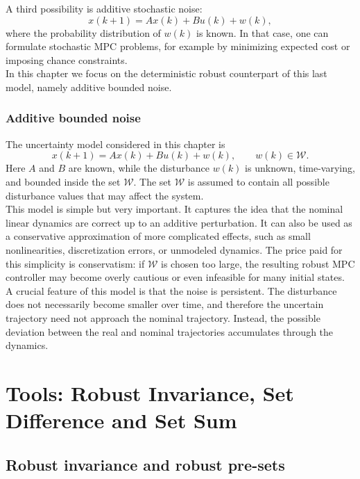 A third possibility is additive stochastic noise:
\[
    x(k+1) = Ax(k) + Bu(k) + w(k),
\]
where the probability distribution of \(w(k)\) is known. In that case, one can formulate stochastic
MPC problems, for example by minimizing expected cost or imposing chance constraints.\\
In this chapter we focus on the deterministic robust counterpart of this last model, namely
additive bounded noise.

\subsubsection{Additive bounded noise}

The uncertainty model considered in this chapter is
\[
    x(k+1) = Ax(k) + Bu(k) + w(k),
    \qquad
    w(k) \in \mathcal{W}.
\]
Here \(A\) and \(B\) are known, while the disturbance \(w(k)\) is unknown, time-varying, and
bounded inside the set \(\mathcal{W}\). The set \(\mathcal{W}\) is assumed to contain all possible
disturbance values that may affect the system.\\
This model is simple but very important. It captures the idea that the nominal linear dynamics
are correct up to an additive perturbation. It can also be used as a conservative approximation
of more complicated effects, such as small nonlinearities, discretization errors, or unmodeled
dynamics. The price paid for this simplicity is conservatism: if \(\mathcal{W}\) is chosen too large,
the resulting robust MPC controller may become overly cautious or even infeasible for many
initial states.\\

A crucial feature of this model is that the noise is persistent. The disturbance does not
necessarily become smaller over time, and therefore the uncertain trajectory need not approach
the nominal trajectory. Instead, the possible deviation between the real and nominal trajectories
accumulates through the dynamics.

\section{Tools: Robust Invariance, Set Difference and Set Sum}

\subsection{Robust invariance and robust pre-sets}
